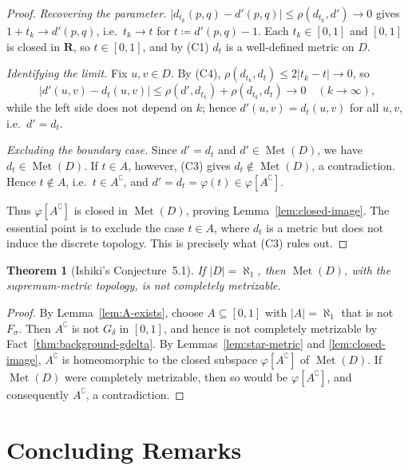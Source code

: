 \documentclass[12pt]{article}
\newtheorem{theorem}{Theorem}[section]
\theoremstyle{definition}
\newcommand{\Met}{\operatorname{Met}}
\newcommand{\Fsigma}{F_{\!\sigma}}
\newcommand{\Gdelta}{G_{\!\delta}}
\begin{document}
\begin{proof}
  \emph{Recovering the parameter.} $\lvert d_{t_k}(p,q)-d'(p,q)\rvert \le
  \rho(d_{t_k},d')\to 0$ gives $1+t_k \to d'(p,q)$, i.e.\ $t_k \to t$ for $t \coloneqq
  d'(p,q)-1$. Each $t_k \in [0,1]$ and $[0,1]$ is closed in $\mathbf{R}$, so
  $t \in [0,1]$, and by (C1) $d_t$ is a well-defined metric on $D$.

  \emph{Identifying the limit.} Fix $u,v \in D$. By (C4),
  $\rho(d_{t_k},d_t) \le 2\lvert t_k-t\rvert \to 0$, so
  \[
    \lvert d'(u,v)-d_t(u,v)\rvert \le \rho(d',d_{t_k}) +
    \rho(d_{t_k},d_t) \longrightarrow 0 \quad (k \to \infty),
  \]
  while the left side does not depend on $k$; hence $d'(u,v)=d_t(u,v)$ for
  all $u,v$, i.e.\ $d' = d_t$.

  \emph{Excluding the boundary case.}
  Since $d'=d_t$ and $d'\in\Met(D)$, we have $d_t\in\Met(D)$.
  If $t\in A$, however, (C3) gives $d_t\notin\Met(D)$, a contradiction.
  Hence $t \notin A$, i.e.\ $t \in A^\complement$, and $d' = d_t
  = \varphi(t) \in \varphi[A^\complement]$.

  Thus $\varphi[A^\complement]$ is closed in $\Met(D)$, proving
  Lemma~\ref{lem:closed-image}. The essential point is to exclude
  the case $t\in A$, where $d_t$ is a metric but does not induce
  the discrete topology. This is precisely what (C3) rules out.
\end{proof}

\begin{theorem}[Ishiki's Conjecture~5.1]
  \label{thm:conj51}
  If $\lvert D\rvert = \aleph_1$, then $\Met(D)$, with the supremum-metric
  topology, is not completely metrizable.
\end{theorem}

\begin{proof}
  By Lemma~\ref{lem:A-exists}, choose $A\subseteq[0,1]$ with
  $|A|=\aleph_1$ that is not $\Fsigma$. Then $A^\complement$ is not
  $\Gdelta$ in $[0,1]$, and hence is not completely metrizable by
  Fact~\ref{thm:background-gdelta}.
  By Lemmas~\ref{lem:star-metric} and \ref{lem:closed-image},
  $A^\complement$ is homeomorphic to the closed subspace
  $\varphi[A^\complement]$ of $\Met(D)$. If $\Met(D)$ were completely
  metrizable, then so would be $\varphi[A^\complement]$, and consequently
  $A^\complement$, a contradiction.
\end{proof}

\section{Concluding Remarks}
\label{sec:concluding}
\end{document}
